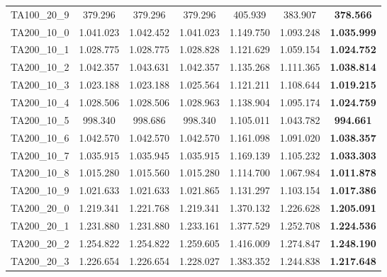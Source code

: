 \begin{tabular}{cc|cc|ccc}
TA100\_20\_9       & 379.296          & 379.296          & 379.296          & 405.939          & 383.907          & {\bf 378.566}   \\ 
TA200\_10\_0       & 1.041.023        & 1.042.452        & 1.041.023        & 1.149.750        & 1.093.248        & {\bf 1.035.999} \\ 
TA200\_10\_1       & 1.028.775        & 1.028.775        & 1.028.828        & 1.121.629        & 1.059.154        & {\bf 1.024.752} \\ 
TA200\_10\_2       & 1.042.357        & 1.043.631        & 1.042.357        & 1.135.268        & 1.111.365        & {\bf 1.038.814} \\ 
TA200\_10\_3       & 1.023.188        & 1.023.188        & 1.025.564        & 1.121.211        & 1.108.644        & {\bf 1.019.215} \\ 
TA200\_10\_4       & 1.028.506        & 1.028.506        & 1.028.963        & 1.138.904        & 1.095.174        & {\bf 1.024.759} \\ 
TA200\_10\_5       & 998.340          & 998.686          & 998.340          & 1.105.011        & 1.043.782        & {\bf 994.661}   \\ 
TA200\_10\_6       & 1.042.570        & 1.042.570        & 1.042.570        & 1.161.098        & 1.091.020        & {\bf 1.038.357} \\ 
TA200\_10\_7       & 1.035.915        & 1.035.945        & 1.035.915        & 1.169.139        & 1.105.232        & {\bf 1.033.303} \\ 
TA200\_10\_8       & 1.015.280        & 1.015.560        & 1.015.280        & 1.114.700        & 1.067.984        & {\bf 1.011.878} \\ 
TA200\_10\_9       & 1.021.633        & 1.021.633        & 1.021.865        & 1.131.297        & 1.103.154        & {\bf 1.017.386} \\ 
TA200\_20\_0       & 1.219.341        & 1.221.768        & 1.219.341        & 1.370.132        & 1.226.628        & {\bf 1.205.091} \\ 
TA200\_20\_1       & 1.231.880        & 1.231.880        & 1.233.161        & 1.377.529        & 1.252.708        & {\bf 1.224.536} \\ 
TA200\_20\_2       & 1.254.822        & 1.254.822        & 1.259.605        & 1.416.009        & 1.274.847        & {\bf 1.248.190} \\ 
TA200\_20\_3       & 1.226.654        & 1.226.654        & 1.228.027        & 1.383.352        & 1.244.838        & {\bf 1.217.648} \\ 

\end{tabular}
